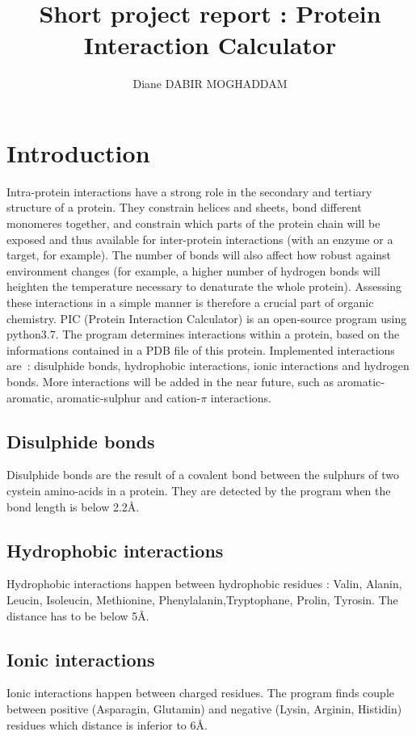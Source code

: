 \documentclass[]{article}
\title{Short project report : Protein Interaction Calculator}
\author{Diane DABIR MOGHADDAM}
\begin{document}
\maketitle


\section{Introduction}
Intra-protein interactions have a strong role in the secondary and tertiary structure of a protein. They constrain helices and sheets, bond different monomeres together, and constrain which parts of the protein chain will be exposed and thus available for inter-protein interactions (with an enzyme or a target, for example).
The number of bonds will also affect how robust against environment changes (for example, a higher number of hydrogen bonds will heighten the temperature necessary to denaturate the whole protein).
Assessing these interactions in a simple manner is therefore a crucial part of organic chemistry.
PIC (Protein Interaction Calculator) is an open-source program using python3.7.
The program determines interactions within a protein, based on the informations contained in a PDB file of this protein.
Implemented interactions are : disulphide bonds, hydrophobic interactions, ionic interactions and hydrogen bonds.
More interactions will be added in the near future, such as aromatic-aromatic, aromatic-sulphur and cation-$\pi$ interactions.

\subsection{Disulphide bonds}
Disulphide bonds are the result of a covalent bond between the sulphurs of two cystein amino-acids in a protein. They are detected by the program when the bond length is below 2.2\si{\angstrom}.

\subsection{Hydrophobic interactions}
Hydrophobic interactions happen between hydrophobic residues : Valin, Alanin, Leucin, Isoleucin, Methionine, Phenylalanin,Tryptophane, Prolin, Tyrosin.
The distance has to be below 5\si{\angstrom}. 

\subsection{Ionic interactions}
Ionic interactions happen between charged residues. The program finds couple between positive (Asparagin, Glutamin) and negative (Lysin, Arginin, Histidin) residues which distance is inferior to 6\si{\angstrom}.
\end{document}
